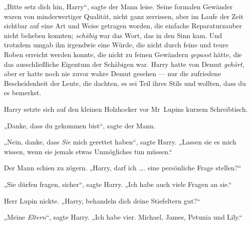 „Bitte setz dich hin, Harry“, sagte der Mann leise. Seine formalen Gewänder waren von minderwertiger Qualität, nicht ganz zerrissen, aber im Laufe der Zeit sichtbar auf eine Art und Weise getragen worden, die einfache Reparaturzauber nicht beheben konnten; \emph{schäbig} war das Wort, das in den Sinn kam. Und trotzdem umgab ihn irgendwie eine Würde, die nicht durch feine und teure Roben erreicht werden konnte, die nicht zu feinen Gewändern \emph{gepasst} hätte, die das ausschließliche Eigentum der Schäbigen war. Harry hatte von Demut \emph{gehört}, aber er hatte noch nie zuvor wahre Demut gesehen — nur die zufriedene Bescheidenheit der Leute, die dachten, es sei Teil ihres Stils und wollten, dass du es bemerkst.

Harry setzte sich auf den kleinen Holzhocker vor Mr~Lupins kurzem Schreibtisch.

„Danke, dass du gekommen bist“, sagte der Mann.

„Nein, danke, dass \emph{Sie} mich gerettet haben“, sagte Harry.
„Lassen sie es mich wissen, wenn sie jemals etwas Unmögliches tun müssen.“

Der Mann schien zu zögern.
„Harry, darf ich …. eine persönliche Frage stellen?“

„Sie dürfen fragen, sicher“, sagte Harry.
„Ich habe auch viele Fragen an sie.“

Herr Lupin nickte.
„Harry, behandeln dich deine Stiefeltern gut?“

„Meine \emph{Eltern}“, sagte Harry.
„Ich habe vier. Michael, James, Petunia und Lily.“

